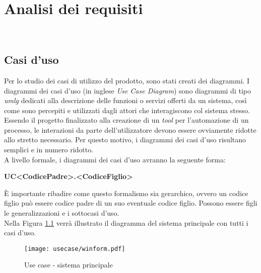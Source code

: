 
\chapter{Analisi dei requisiti}
\label{cap:analisi-requisiti}

\noindent {}\\

\section{Casi d'uso}

\noindent Per lo studio dei casi di utilizzo del prodotto, sono stati creati dei diagrammi.
I diagrammi dei casi d'uso (in inglese \emph{\textit{Use Case} Diagram}) sono diagrammi di tipo \textit{\gls{umlg}} dedicati alla descrizione delle funzioni o servizi offerti da un sistema, così come sono percepiti e utilizzati dagli attori che interagiscono col sistema stesso. \cite{site:wiki}
Essendo il progetto finalizzato alla creazione di un \textit{tool} per l'automazione di un processo, le interazioni da parte dell'utilizzatore devono essere ovviamente ridotte allo stretto necessario. Per questo motivo, i diagrammi dei casi d'uso risultano semplici e in numero ridotto.\\

\noindent A livello formale, i diagrammi dei casi d'uso avranno la seguente forma:
\begin{center}
    \textbf{UC<CodicePadre>.<CodiceFiglio>}
\end{center}
\noindent È importante ribadire come questo formalismo sia gerarchico, ovvero un codice figlio
può essere codice padre di un suo eventuale codice figlio. Possono essere figli le generalizzazioni e i sottocasi d'uso.\\

\noindent Nella Figura \ref{use-case-sistema-principale} verrà illustrato il diagramma del sistema principale con tutti i casi d'uso.
\vspace*{\fill}
\begin{figure}[!h] 
   \centering 
   \texttt{[image: usecase/winform.pdf]} 
   \caption{Use case - sistema principale}
   \label{use-case-sistema-principale}
\end{figure}
\vspace*{\fill}

